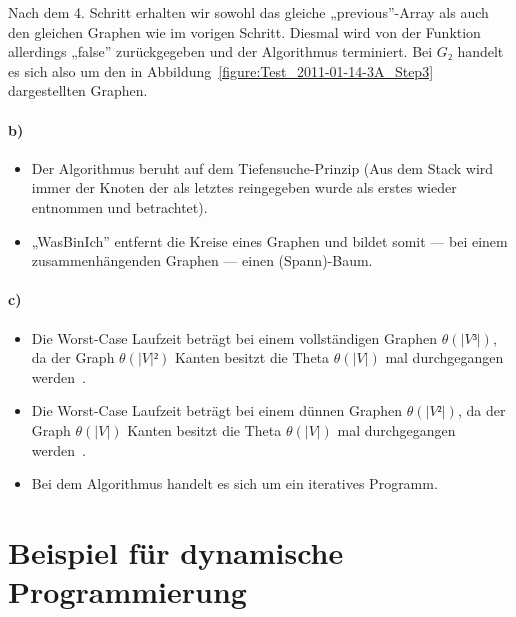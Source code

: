 \documentclass[a4paper, 12pt]{article}
\begin{document}
Nach dem 4. Schritt erhalten wir sowohl das gleiche „previous”-Array als auch
den gleichen Graphen wie im vorigen Schritt. Diesmal wird von der Funktion
allerdings „false” zurückgegeben und der Algorithmus terminiert. Bei $G₂$
handelt es sich also um den in Abbildung~\ref{figure:Test_2011-01-14-3A_Step3}
dargestellten Graphen.

\paragraph{b)}

\begin{itemize}

    \item Der Algorithmus beruht auf dem Tiefensuche-Prinzip (Aus dem Stack
    wird immer der Knoten der als letztes reingegeben wurde als erstes wieder
    entnommen und betrachtet).

    \item „WasBinIch” entfernt die Kreise eines Graphen und bildet somit — bei
    einem zusammenhängenden Graphen — einen (Spann)-Baum.

\end{itemize}

\paragraph{c)}

\begin{itemize}

	\item Die Worst-Case Laufzeit beträgt bei einem vollständigen Graphen
    $θ\left(|V³|\right)$, da der Graph $θ\left(|V|²\right)$ Kanten besitzt die
    Theta $θ\left(|V|\right)$ mal durchgegangen
    werden~\cite{Juggl3r_Beispiel3}.

    \item Die Worst-Case Laufzeit beträgt bei einem dünnen Graphen
    $θ\left(|V²|\right)$, da der Graph $θ\left(|V|\right)$ Kanten besitzt die
    Theta $θ\left(|V|\right)$ mal durchgegangen
    werden~\cite{Juggl3r_Beispiel3}.

    \item Bei dem Algorithmus handelt es sich um ein iteratives Programm.

\end{itemize}

\section{Beispiel für dynamische Programmierung}
\end{document}
